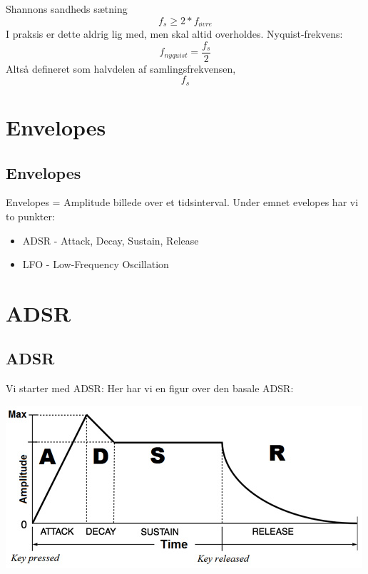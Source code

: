 \documentclass[12pt, letterpaper]{article}
\begin{document}
Shannons sandheds sætning
$$f_s\geq 2*f_{øvre}$$
I praksis er dette aldrig lig med, men skal altid overholdes. 
Nyquist-frekvens:
$$f_{nyquist} = \frac{f_s}{2}$$
Altså defineret som halvdelen af samlingsfrekvensen, $$f_s$$

\section{Envelopes}

\subsection{Envelopes}


Envelopes = Amplitude billede over et tidsinterval. 
Under emnet evelopes har vi to punkter: 
\begin{itemize}
\item ADSR - Attack, Decay, Sustain, Release
\item LFO - Low-Frequency Oscillation
\end{itemize}


\section{ADSR}

\subsection{ADSR}

Vi starter med ADSR: 
Her har vi en figur over den basale ADSR: 

\begin{center}
\includegraphics[width=\textwidth]{billeder/ADSR}
\end{center}
\end{document}
